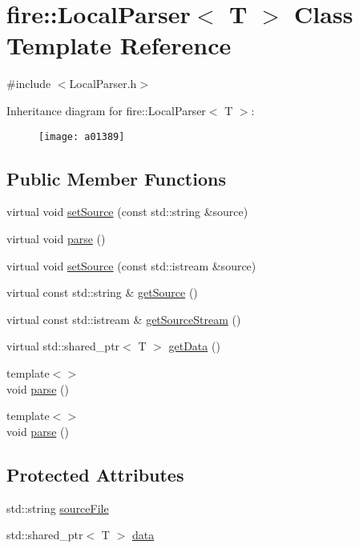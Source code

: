 \hypertarget{a01389}{}\section{fire\+:\+:Local\+Parser$<$ T $>$ Class Template Reference}
\label{a01389}


{\ttfamily \#include $<$Local\+Parser.\+h$>$}

Inheritance diagram for fire\+:\+:Local\+Parser$<$ T $>$\+:\begin{figure}[H]
\begin{center}
\leavevmode
\texttt{[image: a01389]}
\end{center}
\end{figure}
\subsection*{Public Member Functions}
\begin{DoxyCompactItemize}
\item 
virtual void \hyperlink{a01389_afcaec6429fdd6e5d53642a32c001ff73}{set\+Source} (const std\+::string \&source)
\item 
virtual void \hyperlink{a01389_abd8929aea06c2dda40256d2e58236650}{parse} ()
\item 
virtual void \hyperlink{a01389_aed4357541f2ff7d46f8846bd07bb3c42}{set\+Source} (const std\+::istream \&source)
\item 
virtual const std\+::string \& \hyperlink{a01389_aedb7fe10911182525a719963b9b56726}{get\+Source} ()
\item 
virtual const std\+::istream \& \hyperlink{a01389_a9bf19a3cc9ae8ac0e6e7a0e7f6212cdc}{get\+Source\+Stream} ()
\item 
virtual std\+::shared\+\_\+ptr$<$ T $>$ \hyperlink{a01389_ab9016cca8e5dca516bb57c6a8e76607a}{get\+Data} ()
\item 
{\footnotesize template$<$$>$ }\\void \hyperlink{a01389_a34fd9ffb0196c612c75b5288ed5e219b}{parse} ()
\item 
{\footnotesize template$<$$>$ }\\void \hyperlink{a01389_ae904e264fe16708b3e434adea59e1b88}{parse} ()
\end{DoxyCompactItemize}
\subsection*{Protected Attributes}
\begin{DoxyCompactItemize}
\item 
std\+::string \hyperlink{a01389_acf921ee916266efe70be5b24bec37fce}{source\+File}
\item 
std\+::shared\+\_\+ptr$<$ T $>$ \hyperlink{a01389_af8f722c7e35378c69e76e4275d384d86}{data}
\end{DoxyCompactItemize}


